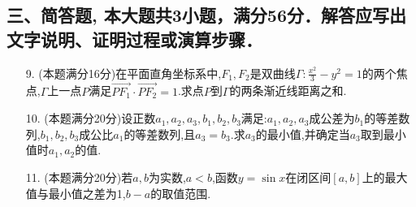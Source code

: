 \documentclass[10pt,a4paper]{ctexart}
\begin{document}
	\subsection*{三、简答题, 本大题共3小题，满分56分．解答应写出文字说明、证明过程或演算步骤．}
	\begin{spacing}{1.8}
		\begin{itemize}
			\item[9.](本题满分16分)在平面直角坐标系中,$F_1,F_2$是双曲线$\Gamma :\frac{x^2}{3}-y^2=1$的两个焦点,$\Gamma$上一点$P$满足$\Vec{PF_1} \cdot \vec{PF_2}=1$.求点$P$到$\Gamma$的两条渐近线距离之和.
			\item[10.](本题满分20分)设正数$a_1,a_2,a_3,b_1,b_2,b_3$满足:$a_1,a_2,a_3$成公差为$b_1$的等差数列,$b_1,b_2,b_3$成公比$a_1$的等差数列,且$a_3=b_3$.求$a_3$的最小值,并确定当$a_3$取到最小值时$a_1,a_2$的值.
			\item[11.](本题满分20分)若$a,b$为实数,$a<b$,函数$y=\sin{x}$在闭区间$[a,b]$上的最大值与最小值之差为1,$b-a$的取值范围.
		\end{itemize}
	\end{spacing}
\end{document}
